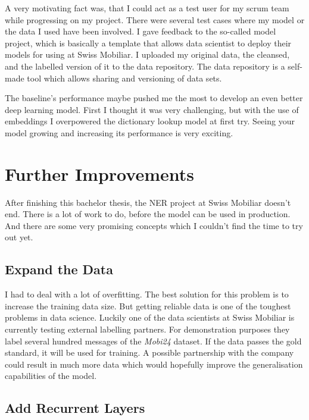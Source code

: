 A very motivating fact was, that I could act as a test user for my scrum team while progressing on my project. There were several test cases where my model or the data I used have been involved. I gave feedback to the so-called model project, which is basically a template that allows data scientist to deploy their models for using at Swiss Mobiliar. I uploaded my original data, the cleansed, and the labelled version of it to the data repository. The data repository is a self-made tool which allows sharing and versioning of data sets.

The baseline's performance maybe pushed me the most to develop an even better deep learning model. First I thought it was very challenging, but with the use of embeddings I overpowered the dictionary lookup model at first try. Seeing your model growing and increasing its performance is very exciting.

\section{Further Improvements}

After finishing this bachelor thesis, the NER project at Swiss Mobiliar doesn't end. There is a lot of work to do, before the model can be used in production. And there are some very promising concepts which I couldn't find the time to try out yet.

\subsection{Expand the Data}

I had to deal with a lot of overfitting. The best solution for this problem is to increase the training data size. But getting reliable data is one of the toughest problems in data science. Luckily one of the data scientists at Swiss Mobiliar is currently testing external labelling partners. For demonstration purposes they label several hundred messages of the \emph{Mobi24} dataset. If the data passes the gold standard, it will be used for training. A possible partnership with the company could result in much more data which would hopefully improve the generalisation capabilities of the model.

\subsection{Add Recurrent Layers}

